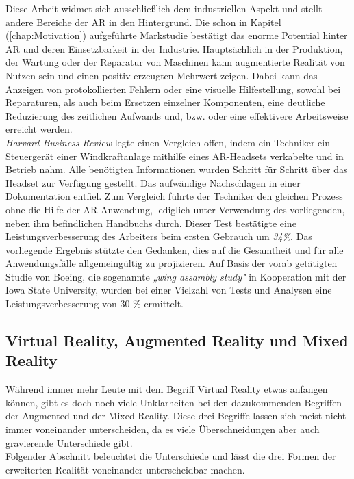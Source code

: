Diese Arbeit widmet sich ausschließlich dem industriellen Aspekt und stellt andere Bereiche der \acl{AR} in den Hintergrund. 
Die schon in Kapitel (\ref{chap:Motivation}) aufgeführte Markstudie bestätigt das enorme Potential hinter \acl{AR} und deren Einsetzbarkeit 
in der Industrie. Hauptsächlich in der Produktion, der Wartung oder der Reparatur von Maschinen kann augmentierte Realität von Nutzen sein 
und einen positiv erzeugten Mehrwert zeigen. Dabei kann das Anzeigen von protokollierten Fehlern oder eine visuelle 
Hilfestellung, sowohl bei Reparaturen, als auch beim Ersetzen einzelner Komponenten, eine deutliche Reduzierung des 
zeitlichen Aufwands und, bzw. oder eine effektivere Arbeitsweise erreicht werden. 
\\
\textit{Harvard Business Review} legte einen Vergleich offen, indem ein Techniker ein Steuergerät einer Windkraftanlage mithilfe 
eines \acs{AR}-Headsets verkabelte und in Betrieb nahm. Alle benötigten Informationen wurden Schritt für Schritt über das Headset zur Verfügung 
gestellt. Das aufwändige Nachschlagen in einer Dokumentation entfiel. Zum Vergleich führte der Techniker den gleichen Prozess ohne die Hilfe der AR-Anwendung, 
lediglich unter Verwendung des vorliegenden, neben ihm befindlichen Handbuchs durch.
Dieser Test bestätigte eine Leistungsverbesserung des Arbeiters beim ersten Gebrauch um \textit{34\%}.\cite{harvardbr.2017m} Das vorliegende Ergebnis stützte den 
Gedanken, dies auf die Gesamtheit und für alle Anwendungsfälle allgemeingültig zu projizieren. Auf Basis der 
vorab getätigten Studie von Boeing, die sogenannte \textit{„wing assambly study"} in Kooperation mit der Iowa State University, wurden 
bei einer Vielzahl von Tests und Analysen eine Leistungsverbesserung von 30 \% ermittelt. \cite{boeingStudy.2015a}


\subsection{Virtual Reality, Augmented Reality und Mixed Reality}
Während immer mehr Leute mit dem Begriff Virtual Reality etwas anfangen können, gibt es doch noch viele Unklarheiten bei den dazukommenden 
Begriffen der Augmented und der Mixed Reality. Diese drei Begriffe lassen sich meist nicht immer voneinander unterscheiden, da es viele 
Überschneidungen aber auch gravierende Unterschiede gibt. 
\\ 
Folgender Abschnitt beleuchtet die Unterschiede und lässt die drei Formen der erweiterten Realität voneinander unterscheidbar machen.
